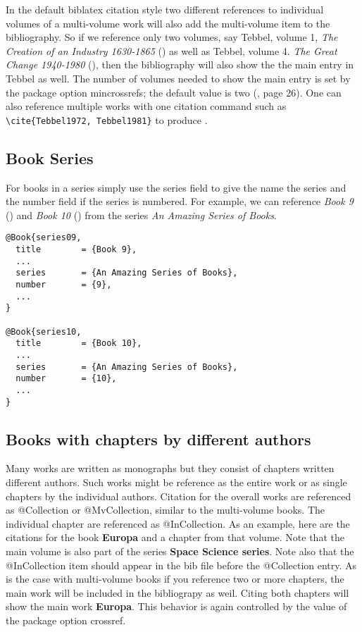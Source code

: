 \documentclass{article}
\begin{document}
In the default {\ttfamily biblatex} citation style two different
references to individual volumes of a multi-volume work will also add
the multi-volume item to the bibliography. So if we reference only two
volumes, say Tebbel, volume 1, {\itshape The Creation of an Industry
  1630-1865} (\cite{Tebbel1972}) as well as Tebbel, volume
4. {\itshape The Great Change 1940-1980} (\cite{Tebbel1981}), then the
bibliography will also show the the main entry in Tebbel as well. The
number of volumes needed to show the main entry is set by the package
option {\ttfamily mincrossrefs}; the default value is two
(\cite{Kime2019}, page 26).  One can also reference multiple works
with one citation command such as \verb|\cite{Tebbel1972, Tebbel1981}|
to produce \cite{Tebbel1972, Tebbel1981}.

\subsection{Book Series}

For books in a series simply use the {\ttfamily series} field to give
the name the series and the {\ttfamily number} field if the series is
numbered. For example, we can reference {\itshape Book 9}
(\cite{book09}) and {\itshape Book 10} (\cite{book10}) from the series
{\itshape An Amazing Series of Books}.

\begin{verbatim}
@Book{series09,
  title        = {Book 9},
  ...
  series       = {An Amazing Series of Books},
  number       = {9},
  ...
}

@Book{series10,
  title        = {Book 10},
  ...
  series       = {An Amazing Series of Books},
  number       = {10},
  ...
}
\end{verbatim}


\subsection{Books with chapters by different authors}

Many works are written as monographs but they consist of chapters
written different authors. Such works might be reference as the entire
work or as single chapters by the individual authors. Citation for the
overall works are referenced as {\ttfamily @Collection} or {\ttfamily
  @MvCollection}, similar to the multi-volume books.  The individual
chapter are referenced as {\ttfamily @InCollection}. As an example,
here are the citations for the book {\bfseries Europa} and a chapter
from that volume.  Note that the main volume is also part of the
series {\bfseries Space Science series}. Note also that the {\ttfamily
  @InCollection} item should appear in the bib file before the
{\ttfamily @Collection} entry. As is the case with multi-volume books
if you reference two or more chapters, the main work will be included
in the bibliograpy as weil. Citing both chapters \cite{Alexander2009,
  Canup2009} will show the main work {\bfseries Europa}. This behavior
is again controlled by the value of the package option {\ttfamily
  crossref}.
\end{document}
